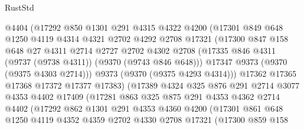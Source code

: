 \begin{lexlean}{RustStd}
\begin{coremodule}
{\begin{coremodule}
{{{{{{{{{{{{{{{{{{{{{{{{{{{{{{{{{{{{{{{                    @4404
                    (@17292
                      @850
                      @1301
                      @291
                      @4315
                      @4322
                      @4200
                      (@17301
                        @849
                        @648
                        @1250
                        @4119
                        @4314
                        @4321
                        @2702
                        @4292
                        @2708
                        @17321
                        (@17300
                          @847
                          @158
                          @648
                          @27
                          @4311
                          @2714
                          @2727
                          @2702
                          @4302
                          @2708
                          (@17335 @846 @4311 (@9737 (@9738 @4311)) (@9370 (@9743 @846 @648)))
                          @17347
                          @9373
                          (@9370 (@9375 @4303 @2714)))
                        @9373
                        (@9370 (@9375 @4293 @4314)))
                      @17362
                      @17365
                      @17368
                      @17372
                      @17377
                      @17383)
                    (@17389
                      @4324
                      @325
                      @876
                      @291
                      @2714
                      @3077
                      @4353
                      @4402
                      @17409
                      (@17281
                        @863
                        @325
                        @875
                        @291
                        @4353
                        @4362
                        @2714
                        @4402
                        (@17292
                          @862
                          @1301
                          @291
                          @4353
                          @4360
                          @4200
                          (@17301
                            @861
                            @648
                            @1250
                            @4119
                            @4352
                            @4359
                            @2702
                            @4330
                            @2708
                            @17321
                            (@17300
                              @859
                              @158
}}}}}}}}}}}}}}}}}}}}}}}}}}}}}}}}}}}}}}}
\end{coremodule}}
\end{coremodule}
\end{lexlean}
